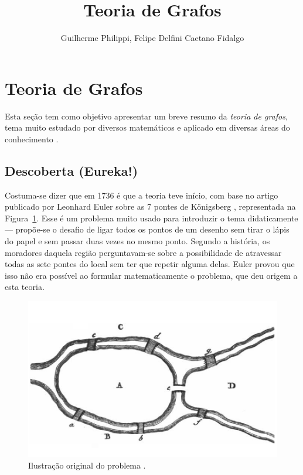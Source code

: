 \documentclass[a4paper,12pt]{article}
\title{Teoria de Grafos}
\author{Guilherme Philippi, Felipe Delfini Caetano Fidalgo}
\begin{document}
\maketitle
\tableofcontents

\section{Teoria de Grafos\label{sec:grafos}}
Esta seção tem como objetivo apresentar um breve resumo da \textit{teoria de grafos}, tema muito estudado por diversos matemáticos e aplicado em diversas áreas do conhecimento \cite{GraphTheoryApplicationsBondy}.

\subsection{Descoberta (Eureka!)}
Costuma-se dizer que em 1736 é que a teoria teve início, com base no artigo publicado por Leonhard Euler sobre as 7 pontes de Königsberg \cite{euler:KOENIGSBERG} \cite{GraphTheoryApplicationsBondy}, representada na Figura~\ref{fig:koni}. Esse é um problema muito usado para introduzir o tema didaticamente --- propõe-se o desafio de ligar todos os pontos de um desenho sem tirar o lápis do papel e sem passar duas vezes no mesmo ponto. Segundo a história, os moradores daquela região perguntavam-se sobre a possibilidade de atravessar todas as sete pontes do local sem ter que repetir alguma delas. Euler provou que isso não era possível ao formular matematicamente o problema, que deu origem a esta teoria.

\begin{figure}[H]
	\begin{center}
		\includegraphics[width=0.7\linewidth]{koenigsbern.png}
	\end{center}
	\caption{Ilustração original do problema \cite{euler:KOENIGSBERG}.}
	\label{fig:koni}
\end{figure}
\end{document}
